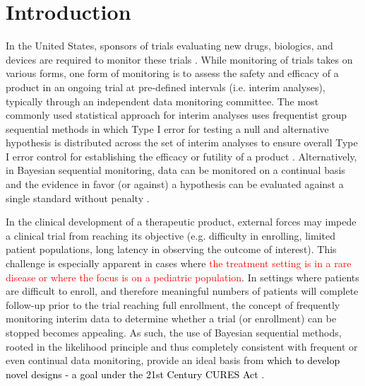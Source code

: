 \documentclass[12pt]{article}
\begin{document}
\section{Introduction}

In the United States, sponsors of trials evaluating new drugs, biologics, and devices are required to monitor these trials \citep{FDA2006}. 
%
While monitoring of trials takes on various forms, one form of monitoring is to assess the safety and efficacy of a product in an ongoing trial at pre-defined intervals (i.e. interim analyses), typically through an independent data monitoring committee. 
%
The most commonly used statistical approach for interim analyses uses frequentist group sequential methods in which Type I error for testing a null and alternative hypothesis is distributed across the set of interim analyses to ensure overall Type I error control for establishing the efficacy or futility of a product \citep{Jennison2000}.  
%
Alternatively, in Bayesian sequential monitoring, data can be monitored on a continual basis and the evidence in favor (or against) a hypothesis can be evaluated against a single standard without penalty \citep{Spiegelhalter1993}. %

In the clinical development of a therapeutic product, external forces may impede a clinical trial from reaching its objective (e.g. difficulty in enrolling, limited patient populations, long latency in observing the outcome of interest). 
%
This challenge is especially apparent in cases where \textcolor{red}{the treatment setting is in a rare disease or where the focus is on a pediatric population}.
%
In settings where patients are difficult to enroll, and therefore meaningful numbers of patients will complete follow-up prior to the trial reaching full enrollment, the concept of frequently monitoring interim data to determine whether a trial (or enrollment) can be stopped becomes appealing. 
%
As such, the use of Bayesian sequential methods, rooted in the likelihood principle and thus completely consistent with frequent or even continual data monitoring, provide an ideal basis from \textcolor{black}{which to develop novel designs - a goal under the 21st Century CURES Act \citep{USCongress2016}.}
%
\end{document}

